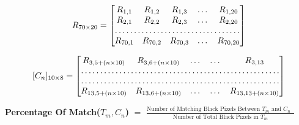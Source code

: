 \documentclass[12pt]{article}
\begin{document}
\[
R_{70 \times 20 }
=
\begin{bmatrix}
    R_{1,1}       & R_{1,2} & R_{1,3} & \dots & R_{1,20} \\
    R_{2,1}       & R_{2,2} & R_{2,3} & \dots & R_{2,20} \\
    \hdotsfor{5} \\
    R_{70,1}       & R_{70,2} & R_{70,3} & \dots & R_{70,20}
\end{bmatrix}
\]

\[
[C_{n}]_{10 \times 8}
=
\begin{bmatrix}
    R_{3,5+(n \times 10)} & R_{3,6+(n \times 10)} & \dots & \dots & R_{3,13} \\
    \hdotsfor{5} \\
    \hdotsfor{5} \\
    R_{13,5+(n \times 10)} & R_{13,6+(n \times 10)} & \dots & \dots & R_{13,13+(n \times 10)}
\end{bmatrix}
\]
\newline

{\bf Percentage Of Match($T_{m} , C_{n}$)}
$ = $
${\frac{\text{Number of Matching Black Pixels Between $T_{m}$ and $C_{n}$ }}{\text{Number of Total Black Pixels in $T_{m}$}} }$
\end{document}

